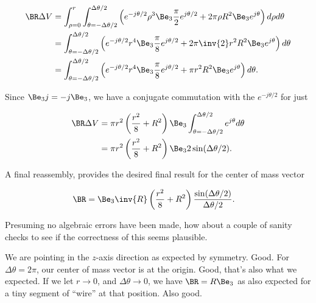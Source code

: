 \begin{align}\label{eqn:torusCenterOfMass:11}
\BR \Delta V 
&= 
\int_{\rho=0}^r \int_{\theta=-\Delta \theta/2}^{\Delta \theta/2} 
\left( e^{-j\theta/2} \rho^3 \Be_3 \frac{\pi}{2} e^{j \theta/2} + 2 \pi \rho R^2 \Be_3 e^{j \theta}  \right) d\rho d\theta \\
&= 
\int_{\theta=-\Delta \theta/2}^{\Delta \theta/2} 
\left( e^{-j\theta/2} r^4 \Be_3 \frac{\pi}{8} e^{j \theta/2} + 2\pi \inv{2} r^2 R^2 \Be_3 e^{j \theta}  \right) d\theta \\
&= 
\int_{\theta=-\Delta \theta/2}^{\Delta \theta/2} 
\left( e^{-j\theta/2} r^4 \Be_3 \frac{\pi}{8} e^{j \theta/2} + \pi r^2 R^2 \Be_3 e^{j \theta}  \right) d\theta.
\end{align}

Since $\Be_3 j = -j \Be_3$, we have a conjugate commutation with the $e^{-j \theta/2}$ for just

\begin{align}\label{eqn:torusCenterOfMass:12}
\BR \Delta V 
&= 
\pi r^2 \left( \frac{r^2}{8} + R^2 \right) \Be_3 
\int_{\theta=-\Delta \theta/2}^{\Delta \theta/2} 
e^{j \theta} d\theta \\
&= 
\pi r^2 \left( \frac{r^2}{8} + R^2 \right) \Be_3 
2 \sin(\Delta \theta/2).
\end{align}

A final reassembly, provides the desired final result for the center of mass vector

\begin{align}\label{eqn:torusCenterOfMass:13}
\BR &= \Be_3 \inv{R} \left( \frac{r^2}{8} + R^2 \right) \frac{\sin(\Delta \theta/2)}{ \Delta \theta/2 }.
\end{align}

Presuming no algebraic errors have been made, how about a couple of sanity checks to see if the correctness of this seems plausible.

We are pointing in the $z$-axis direction as expected by symmetry.  Good.  For $\Delta \theta = 2 \pi$, our center of mass vector is at the origin.  Good, that's also what we expected.  If we let $r \rightarrow 0$, and $\Delta \theta \rightarrow 0$, we have $\BR = R \Be_3$ as also expected for a tiny segment of ``wire'' at that position.  Also good.

\EndNoBibArticle
